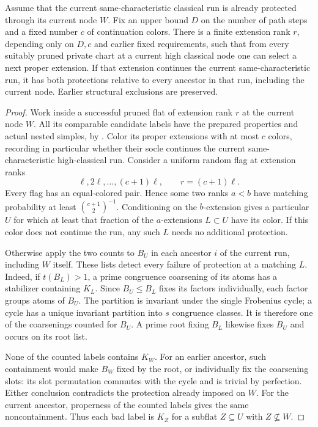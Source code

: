 \begin{proposition}\label{w:selection}
Assume that the current same-characteristic classical run is already protected through its current node $W$. Fix an upper bound $D$ on the number of path steps and a fixed number $c$ of continuation colors. There is a finite extension rank $r$, depending only on $D,c$ and earlier fixed requirements, such that from every suitably pruned private chart at a current high classical node one can select a next proper extension. If that extension continues the current same-characteristic run, it has both protections relative to every ancestor in that run, including the current node. Earlier structural exclusions are preserved.
\end{proposition}
\begin{proof}
Work inside a successful pruned flat of extension rank $r$ at the current
node $W$. All its comparable candidate labels have the prepared
properties and actual nested simples, by .
Color its proper extensions with at most $c$ colors, recording in
particular whether their socle continues the current same-characteristic
high-classical run. Consider a uniform random flag at extension ranks
\[
 \ell,2\ell,\ldots,(c+1)\ell,\qquad r=(c+1)\ell.
\]
Every flag has an equal-colored pair. Hence some two ranks $a<b$ have
matching probability at least $\binom{c+1}{2}^{-1}$. Conditioning on the
$b$-extension gives a particular $U$ for which at least that fraction
of the $a$-extensions $L\subset U$ have its color. If this color does
not continue the run, any such $L$ needs no additional protection.

Otherwise apply the two counts to $B_U$ in each ancestor $i$ of the
current run, including $W$ itself. These lists detect every failure of
protection at a matching $L$. Indeed, if $t(B_L)>1$, a prime congruence
coarsening of its atoms has a stabilizer containing $K_L$. Since
$B_U\le B_L$ fixes its factors individually, each factor groups atoms
of $B_U$. The partition is invariant under the single Frobenius cycle;
a cycle has a unique invariant partition into $s$ congruence classes.
It is therefore one of the coarsenings counted for $B_U$. A prime root
fixing $B_L$ likewise fixes $B_U$ and occurs on its root list.

None of the counted labels contains $K_W$. For an earlier ancestor,
such containment would make $B_W$ fixed by the root, or individually
fix the coarsening slots: its slot permutation commutes with the cycle
and is trivial by perfection. Either conclusion contradicts the
protection already imposed on $W$. For the current ancestor, properness
of the counted labels gives the same noncontainment. Thus each bad label
is $K_Z$ for a subflat $Z\subseteq U$ with $Z\not\subseteq W$.


\end{proof}
